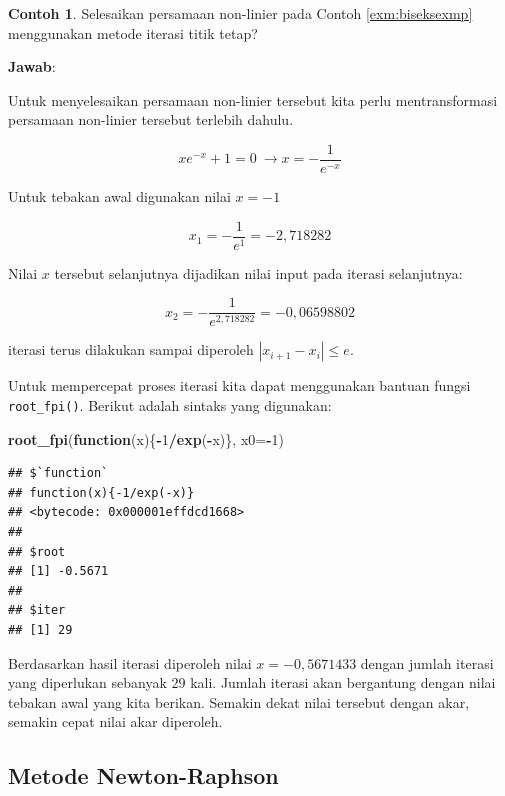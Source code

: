 \documentclass[
]{book}
\newenvironment{Shaded}{\begin{snugshade}}{\end{snugshade}}
\newcommand{\AttributeTok}[1]{\textcolor[rgb]{0.13,0.29,0.53}{#1}}
\newcommand{\ControlFlowTok}[1]{\textcolor[rgb]{0.13,0.29,0.53}{\textbf{#1}}}
\newcommand{\DecValTok}[1]{\textcolor[rgb]{0.00,0.00,0.81}{#1}}
\newcommand{\FunctionTok}[1]{\textcolor[rgb]{0.13,0.29,0.53}{\textbf{#1}}}
\newcommand{\NormalTok}[1]{#1}
\newcommand{\SpecialCharTok}[1]{\textcolor[rgb]{0.81,0.36,0.00}{\textbf{#1}}}
\theoremstyle{definition}
\theoremstyle{definition}
\newtheorem{example}{Contoh}[chapter]
\theoremstyle{definition}
\theoremstyle{definition}
\theoremstyle{remark}
\begin{document}
\begin{example}
\protect\hypertarget{exm:fixexmp}{}\label{exm:fixexmp}Selesaikan persamaan non-linier pada Contoh \ref{exm:biseksexmp} menggunakan metode iterasi titik tetap?
\end{example}

\textbf{Jawab}:

Untuk menyelesaikan persamaan non-linier tersebut kita perlu mentransformasi persamaan non-linier tersebut terlebih dahulu.

\[
xe^{-x}+1=0\ \to x=-\frac{1}{e^{-x}}
\]

Untuk tebakan awal digunakan nilai \(x=-1\)

\[
x_1 = -\frac{1}{e^{1}}=-2,718282
\]

Nilai \(x\) tersebut selanjutnya dijadikan nilai input pada iterasi selanjutnya:

\[
x_2 = -\frac{1}{e^{2,718282}}=-0,06598802
\]

iterasi terus dilakukan sampai diperoleh \(\left| x_{i+1}-x_i \right|\le e\).

Untuk mempercepat proses iterasi kita dapat menggunakan bantuan fungsi \texttt{root\_fpi()}. Berikut adalah sintaks yang digunakan:

\begin{Shaded}
\begin{Highlighting}[]
\FunctionTok{root\_fpi}\NormalTok{(}\ControlFlowTok{function}\NormalTok{(x)\{}\SpecialCharTok{{-}}\DecValTok{1}\SpecialCharTok{/}\FunctionTok{exp}\NormalTok{(}\SpecialCharTok{{-}}\NormalTok{x)\}, }\AttributeTok{x0=}\SpecialCharTok{{-}}\DecValTok{1}\NormalTok{)}
\end{Highlighting}
\end{Shaded}

\begin{verbatim}
## $`function`
## function(x){-1/exp(-x)}
## <bytecode: 0x000001effdcd1668>
## 
## $root
## [1] -0.5671
## 
## $iter
## [1] 29
\end{verbatim}

Berdasarkan hasil iterasi diperoleh nilai \(x=-0,5671433\) dengan jumlah iterasi yang diperlukan sebanyak \(29\) kali. Jumlah iterasi akan bergantung dengan nilai tebakan awal yang kita berikan. Semakin dekat nilai tersebut dengan akar, semakin cepat nilai akar diperoleh.

\hypertarget{newtonraphson}{%
\subsection{Metode Newton-Raphson}\label{newtonraphson}}
\end{document}
